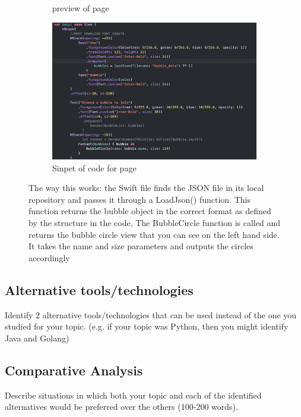 \documentclass[a4paper, 11pt]{report}
\begin{document}
\begin{figure}
\begin{subfigure}[h]{0.3\textwidth}
  \caption{preview of page}
  \label{fig:image1}
\end{subfigure}
\hfill
\begin{subfigure}[h]{0.7\textwidth}
  \includegraphics[width=\textwidth]{viewbubble.png}
  \caption{Sinpet of code for page}
  \label{fig:image2}
\end{subfigure}
\caption{
The way this works: the Swift file finds the JSON file in its local repository and passes it through a LoadJson() function. This function returns the bubble object in the correct format as defined by the structure in the code.
The BubbleCircle function is called and returns the bubble circle view that you can see on the left hand side. It takes the name and size parameters and outputs the circles accordingly
}
  \label{fig:images}
 
\end{figure}

\subsection{Alternative tools/technologies}
Identify 2 alternative tools/technologies that can be used instead of the one you studied for your topic. (e.g. if your topic was Python, then you might identify Java and Golang)
\subsection{Comparative Analysis}
Describe situations in which both your topic and each of the identified alternatives would be preferred over the others (100-200 words).




\newpage



\end{document}
